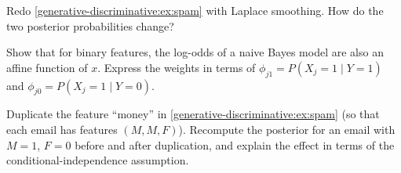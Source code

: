 \begin{notechapter}
\begin{exercise}\label{generative-discriminative:exr:1}
Redo \cref{generative-discriminative:ex:spam} with Laplace smoothing. How do the
two posterior probabilities change?
\end{exercise}

\begin{exercise}\label{generative-discriminative:exr:2}
Show that for binary features, the log-odds of a naive Bayes model are also an
affine function of $x$. Express the weights in terms of
$\phi_{j1} = P(X_j = 1\mid Y=1)$ and $\phi_{j0} = P(X_j=1\mid Y=0)$.
\end{exercise}

\begin{exercise}\label{generative-discriminative:exr:3}
Duplicate the feature ``money'' in \cref{generative-discriminative:ex:spam}
(so that each email has features $(M, M, F)$). Recompute the posterior for an
email with $M = 1$, $F = 0$ before and after duplication, and explain the effect
in terms of the conditional-independence assumption.
\end{exercise}
\end{notechapter}
